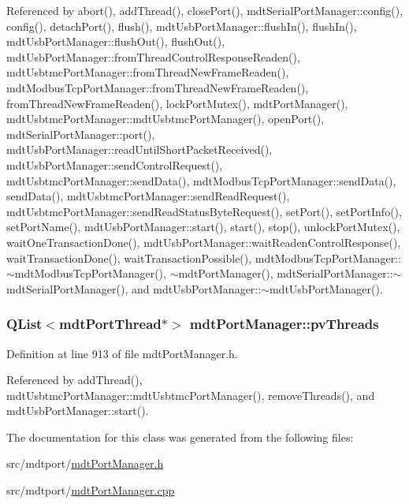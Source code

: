 Referenced by abort(), add\-Thread(), close\-Port(), mdt\-Serial\-Port\-Manager\-::config(), config(), detach\-Port(), flush(), mdt\-Usb\-Port\-Manager\-::flush\-In(), flush\-In(), mdt\-Usb\-Port\-Manager\-::flush\-Out(), flush\-Out(), mdt\-Usb\-Port\-Manager\-::from\-Thread\-Control\-Response\-Readen(), mdt\-Usbtmc\-Port\-Manager\-::from\-Thread\-New\-Frame\-Readen(), mdt\-Modbus\-Tcp\-Port\-Manager\-::from\-Thread\-New\-Frame\-Readen(), from\-Thread\-New\-Frame\-Readen(), lock\-Port\-Mutex(), mdt\-Port\-Manager(), mdt\-Usbtmc\-Port\-Manager\-::mdt\-Usbtmc\-Port\-Manager(), open\-Port(), mdt\-Serial\-Port\-Manager\-::port(), mdt\-Usb\-Port\-Manager\-::read\-Until\-Short\-Packet\-Received(), mdt\-Usb\-Port\-Manager\-::send\-Control\-Request(), mdt\-Usbtmc\-Port\-Manager\-::send\-Data(), mdt\-Modbus\-Tcp\-Port\-Manager\-::send\-Data(), send\-Data(), mdt\-Usbtmc\-Port\-Manager\-::send\-Read\-Request(), mdt\-Usbtmc\-Port\-Manager\-::send\-Read\-Status\-Byte\-Request(), set\-Port(), set\-Port\-Info(), set\-Port\-Name(), mdt\-Usb\-Port\-Manager\-::start(), start(), stop(), unlock\-Port\-Mutex(), wait\-One\-Transaction\-Done(), mdt\-Usb\-Port\-Manager\-::wait\-Readen\-Control\-Response(), wait\-Transaction\-Done(), wait\-Transaction\-Possible(), mdt\-Modbus\-Tcp\-Port\-Manager\-::$\sim$mdt\-Modbus\-Tcp\-Port\-Manager(), $\sim$mdt\-Port\-Manager(), mdt\-Serial\-Port\-Manager\-::$\sim$mdt\-Serial\-Port\-Manager(), and mdt\-Usb\-Port\-Manager\-::$\sim$mdt\-Usb\-Port\-Manager().

\hypertarget{classmdt_port_manager_a8e0d49b789f8b01d469e84b487799573}{
\subsubsection[{pv\-Threads}]{\setlength{\rightskip}{0pt plus 5cm}Q\-List$<${\bf mdt\-Port\-Thread}$\ast$$>$ mdt\-Port\-Manager\-::pv\-Threads\hspace{0.3cm}{\ttfamily [protected]}}}\label{classmdt_port_manager_a8e0d49b789f8b01d469e84b487799573}


Definition at line 913 of file mdt\-Port\-Manager.\-h.



Referenced by add\-Thread(), mdt\-Usbtmc\-Port\-Manager\-::mdt\-Usbtmc\-Port\-Manager(), remove\-Threads(), and mdt\-Usb\-Port\-Manager\-::start().



The documentation for this class was generated from the following files\-:\begin{DoxyCompactItemize}
\item 
src/mdtport/\hyperlink{mdt_port_manager_8h}{mdt\-Port\-Manager.\-h}\item 
src/mdtport/\hyperlink{mdt_port_manager_8cpp}{mdt\-Port\-Manager.\-cpp}\end{DoxyCompactItemize}
